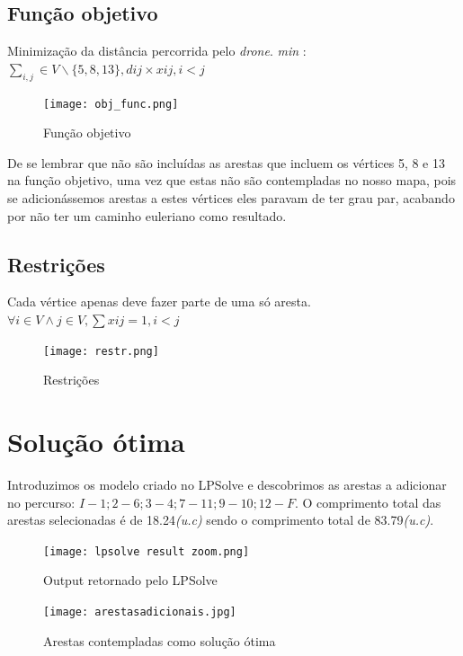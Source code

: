 \documentclass[runningheads]{llncs}
\begin{document}
    \subsection{Função objetivo}
    Minimização da distância percorrida pelo \textit{drone}.
    \newline \textit{min} : $\sum_{i,j}^{} \in V \backslash \{5,8,13\},  dij  \times    xij,  i < j$

    \begin{figure}[h]
        \centering
        \texttt{[image: obj\_func.png]}
        \caption{Função objetivo}
        \label{fig:data5}
    \end{figure}

    \bigskip
    De se lembrar que não são incluídas as arestas que incluem os vértices 5, 8 e 13 na função objetivo, uma vez que estas não são contempladas no nosso mapa, pois se adicionássemos arestas a estes vértices eles paravam de ter grau par, acabando por não ter um caminho euleriano como resultado.

    \newpage
    \subsection{Restrições}
    Cada vértice apenas deve fazer parte de uma só aresta.
    \newline $\forall i \in V \wedge  j \in V,  \sum xij = 1, i < j$

    \begin{figure}[h]
        \centering
        \texttt{[image: restr.png]}
        \caption{Restrições}
        \label{fig:data6}
    \end{figure}


    \newpage

    \section{Solução ótima}
    Introduzimos os modelo criado no LPSolve e descobrimos as arestas a adicionar no
    percurso: $I-1; 2-6; 3-4; 7-11; 9-10; 12-F$. O comprimento total das arestas selecionadas é de 18.24\textit{(u.c)} sendo o comprimento total de 83.79\textit{(u.c)}.

    \begin{figure}[ht]
        \centering
        \texttt{[image: lpsolve result zoom.png]}
        \caption{Output retornado pelo LPSolve}
        \label{fig:data7}
    \end{figure}

    \begin{figure}[ht]
        \centering
        \texttt{[image: arestasadicionais.jpg]}
        \caption{Arestas contempladas como solução ótima}
        \label{fig:data8}
    \end{figure}
\end{document}
